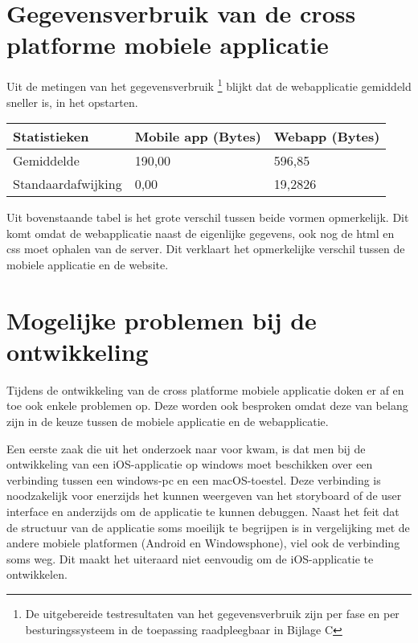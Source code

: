 \section{Gegevensverbruik van de cross platforme mobiele applicatie}
Uit de metingen van het gegevensverbruik \footnote{De uitgebereide testresultaten van het gegevensverbruik zijn per fase en per besturingssysteem in de toepassing raadpleegbaar in Bijlage C}
blijkt dat de webapplicatie gemiddeld sneller is, in het opstarten.
\begin{center}
  \begin{tabular}{| l | l | l |}
    \hline
    Statistieken & Mobile app (Bytes) & Webapp (Bytes) \\ \hline
    Gemiddelde & 190,00 & 596,85 \\ \hline
    Standaardafwijking & 0,00 & 19,2826 \\
    \hline
  \end{tabular}
\end{center}

Uit bovenstaande tabel is het grote verschil tussen beide vormen opmerkelijk. Dit komt omdat de webapplicatie naast de eigenlijke gegevens,
ook nog de html en css moet ophalen van de server. Dit verklaart het opmerkelijke verschil tussen de mobiele applicatie en de website.
\section{Mogelijke problemen bij de ontwikkeling}
Tijdens de ontwikkeling van de cross platforme mobiele applicatie doken er af en toe ook enkele problemen op.
Deze worden ook besproken omdat deze van belang zijn in de keuze tussen de mobiele applicatie en de webapplicatie.

Een eerste zaak die uit het onderzoek naar voor kwam, is dat men bij de ontwikkeling van een iOS-applicatie op windows moet beschikken
over een verbinding tussen een windows-pc en een macOS-toestel. Deze verbinding is noodzakelijk voor enerzijds het kunnen weergeven van
het storyboard of de user interface en anderzijds om de applicatie te kunnen debuggen. Naast het feit dat de structuur van de applicatie
soms moeilijk te begrijpen is in vergelijking met de andere mobiele platformen (Android en Windowsphone), viel ook de verbinding soms weg.
Dit maakt het uiteraard niet eenvoudig om de iOS-applicatie te ontwikkelen.
